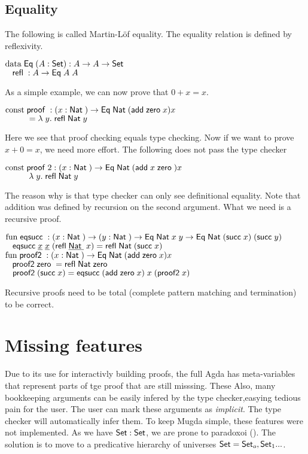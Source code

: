 \subsection{Equality}
The following is called Martin-L\"of equality.
The equality relation is defined by reflexivity.
\begin{bsp}
$\mathrm{data}\; \mathsf{Eq}\; ( A : \mathsf{Set} ) : A \rightarrow A \rightarrow \mathsf{Set} $ \\
$\hspace*{3mm} \mathsf{refl}\; : A \rightarrow \mathsf{Eq}\; A \; A  $
\end{bsp}
As a simple example, we can now prove that $ 0 + x = x $.
\begin{bsp}
$ \mathrm{const}\; \mathsf{proof}\; : ( x : \mathsf{Nat}\; ) \rightarrow{\mathsf{Eq}\;\mathsf{Nat}\;(\mathsf{add}\;\mathsf{zero}\;x) x} $ \\ 
$ \spcx = \lam{y}\refl \Nat y$ 
\end{bsp}
Here we see that proof checking equals type checking.
Now if we want to prove $ x + 0 = x $, we need more effort.
The following does not pass the type checker
\begin{bsp}
$ \mathrm{const}\; \mathsf{proof}\;2 : ( x : \mathsf{Nat}\; ) \rightarrow{\mathsf{Eq}\;\mathsf{Nat}\;(\mathsf{add}\;x \; \mathsf{zero}\;)  x} $ \\ 
$ \spcx \lam{y} \refl \Nat y$ 
\end{bsp}
The reason why is that type checker can only see definitional equality.
Note that addition was defined by recursion on the second argument. 
What we need is a recursive proof.

\begin{bsp}
$\mathrm{fun}\; \mathsf{eqsucc}\; : ( x : \mathsf{Nat}\; ) \rightarrow( y : \mathsf{Nat}\; ) \rightarrow \mathsf{Eq}\; \mathsf{Nat}\; x \; y \rightarrow \mathsf{Eq}\; \mathsf{Nat}\; (\mathsf{succ}\; x) \; (\mathsf{succ}\; y)$ \\
$\hspace*{3mm} \mathsf{eqsucc}\; \underline{x} \; \underline{x} \; (\mathsf{refl}\; \underline{\mathsf{Nat}\;} \; x) = \mathsf{refl}\; \mathsf{Nat}\; (\mathsf{succ}\; x)$\\
$\mathrm{fun}\; \mathsf{proof2}\; : ( x : \mathsf{Nat}\; ) \rightarrow \mathsf{Eq}\; \mathsf{Nat}\; (\mathsf{add}\; \mathsf{zero}\; x) x$\\
$\hspace*{3mm} \mathsf{proof2}\; \mathsf{zero}\; = \mathsf{refl}\; \mathsf{Nat}\; \mathsf{zero}\;$\\
$\hspace*{3mm} \mathsf{proof2}\; (\mathsf{succ}\; x) = \mathsf{eqsucc}\; (\mathsf{add}\; \mathsf{zero}\; x)\; x \; (\mathsf{proof2}\; x)$
\end{bsp}

Recursive proofs need to be total (complete pattern matching and termination) to be correct.

\section{Missing features}
Due to its use for interactivly building proofs, the full Agda has meta-variables that represent parts of tge proof that are still misssing. These 
Also, many bookkeeping arguments can be easily infered by the type checker,easying tedious pain for the user.
The user can mark these arguments as \emph{implicit}. The type checker will automatically infer them.
To keep Mugda simple, these features were not implemented.
As we have $ \mathsf{Set} : \mathsf{Set} $, we are prone to paradoxoi (\cite{coquand86analysis}).
The solution is to move to a predicative hierarchy of universes $ \mathsf{Set} = \mathsf{Set}_o , \mathsf{Set}_1 ... $. 

